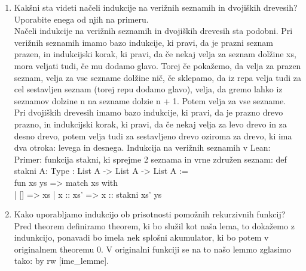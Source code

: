 \documentclass[a4paper]{article}
\begin{document}
\begin{enumerate}
        \item Kakšni sta videti načeli indukcije na verižnih seznamih in dvojiških drevesih? Uporabite enega od njih na primeru.\\
        Načeli indukcije na verižnih seznamih in dvojiških drevesih sta podobni. Pri verižnih seznamih imamo bazo indukcije, ki pravi, da je prazni seznam prazen, in indukcijski korak, ki pravi, da če nekaj velja za seznam dolžine xs, mora veljati tudi, če mu dodamo glavo. Torej če pokažemo, da velja za prazen seznam, velja za vse sezname dolžine nič, če sklepamo, da iz repa velja tudi za cel sestavljen seznam (torej repu dodamo glavo), velja, da gremo lahko iz seznamov dolzine n na sezname dolzie n + 1. Potem velja za vse sezname.\\
        Pri dvojiških drevesih imamo bazo indukcije, ki pravi, da je prazno drevo prazno, in indukcijski korak, ki pravi, da če nekaj velja za levo drevo in za desno drevo, potem velja tudi za sestavljeno drevo oziroma za drevo, ki ima dva otroka: levega in desnega.
        Indukcija na verižnih seznamih v Lean:\\
        Primer: funkcija stakni, ki sprejme 2 seznama in vrne združen seznam: def stakni {A: Type} : List A -> List A -> List A :=\\
        fun xs ys => match xs with\\
        | [] => xs
        | x :: xs' => x :: stakni xs' ys

        \item Kako uporabljamo indukcijo ob prisotnosti pomožnih rekurzivnih funkcij?\\
        Pred theorem definiramo theorem, ki bo služil kot naša lema, to dokažemo z indunkcijo, ponavadi bo imela nek splošni akumulator, ki bo potem v originalnem theoremu 0. V originalni funkciji se na to našo lemmo zglasimo tako: by rw [ime\_lemme].


\end{enumerate}
\end{document}
